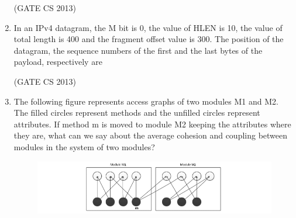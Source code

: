 \documentclass[a4paper, 11pt]{article}
\begin{document}
\begin{enumerate}
     \hfill (GATE CS 2013)

     \item In an IPv4 datagram, the M bit is 0, the value of HLEN is 10, the value of total length is 400 and the fragment offset value is 300. The position of the datagram, the sequence numbers of the first and the last bytes of the payload, respectively are
     \begin{enumerate}
     \end{enumerate}

     \hfill (GATE CS 2013)
     \item The following figure represents access graphs of two modules M1 and M2. The filled circles represent methods and the unfilled circles represent attributes. If method m is moved to module M2 keeping the attributes where they are, what can we say about the average cohesion and coupling between modules in the system of two modules?
     \begin{figure}
         \centering
         \includegraphics[width=\columnwidth]{figs/q38.png}
         \label{fig:placeholder}
     \end{figure}
     \begin{enumerate}
     \end{enumerate}


\end{enumerate}
\end{document}
